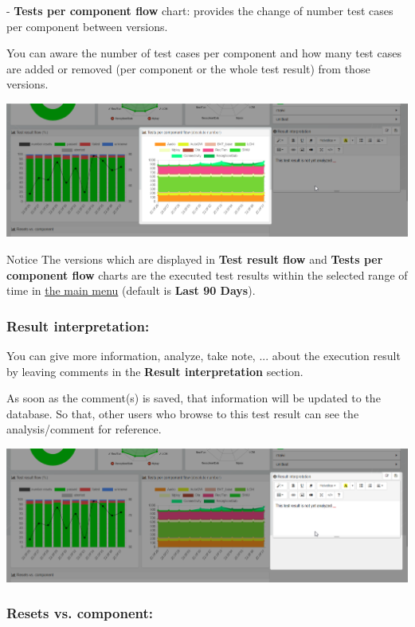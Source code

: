 - \textbf{Tests per component flow} chart: provides the change of number test
cases per component between versions.

You can aware the number of test cases per component and how many test cases are
added or removed (per component or the whole test result) from those versions.

\includegraphics[width=1\linewidth]
{./pictures/dashboard/chart_tests_per_component_flow.png}

\begin{boxhint}{Notice}
The versions which are displayed in \textbf{Test result flow} and 
\textbf{Tests per component flow} charts are the executed test results within 
the selected range of time in 
\hyperref[main-menu]{the main menu} (default is \textbf{Last 90 Days}).
\end{boxhint}

\subsubsection{Result interpretation:}
You can give more information, analyze, take note, ... about the execution
result by leaving comments in the \textbf{Result interpretation} section.

As soon as the comment(s) is saved, that information will be updated to 
the database. So that, other users who browse to this test result can see
the analysis/comment for reference.

\includegraphics[width=1\linewidth]
{./pictures/dashboard/result_interpretation.png}

\subsubsection{Resets vs. component:}

